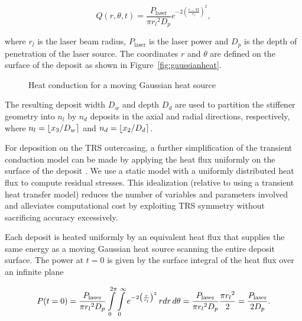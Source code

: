 \begin{equation}
	Q(r,\theta,t) = \dfrac{P_{\textrm{laser}}}{\pi{r_l}^2 D_p}e^{-2\left(\frac{r-{V}t}{r_l}\right)^2}, \label{eg:gaussian}
\end{equation}

where ${r_l}$ is the laser beam radius, $P_{\textrm{laser}}$ is the laser power and $D_p$ is the depth of penetration of the laser source. The coordinates $r$ and $\theta$ are defined on the surface of the deposit as shown in Figure~\ref{fig:gaussianheat}. 

\begin{figure}[h!]
	\centering
	 \hspace{0.1\textwidth}%
	\caption{Heat conduction for a moving Gaussian heat source}
	\label{fig:gaussian}
\end{figure}

The resulting deposit width $D_w$ and depth $D_d$ are used to partition the stiffener geometry into $n_l$ by $n_d$ deposits in the axial and radial directions, respectively, where $n_l = \lfloor x_3/D_w\rceil$ and $n_d = \lfloor x_2/D_d\rceil$. 

For deposition on the \ac{TRS} outercasing, a further simplification of the transient conduction model can be made by applying the heat flux uniformly on the surface of the deposit \cite{Nickel2001}. We use a static model with a uniformly distributed heat flux to compute residual stresses. This idealization (relative to using a transient heat transfer model) reduces the number of variables and parameters involved and alleviates computational cost by exploiting TRS symmetry without sacrificing accuracy excessively.

Each deposit is heated uniformly by an equivalent heat flux that supplies the same energy as a moving Gaussian heat source scanning the entire deposit surface. The power at $t=0$ is given by the surface integral of the heat flux over an infinite plane

\begin{equation}
	\label{eq:power}
	P(t=0) = \dfrac{P_{\textrm{laser}}}{\pi{r_l}^2 D_p} \int\limits_{0}^{2\pi} \int\limits_{0}^{\infty} e^{-2\left(\frac{r}{r_l}\right)^2} \,rdr\,d\theta = \dfrac{P_{\textrm{laser}}}{\pi{r_l}^2 D_p}\dfrac{\pi{r_l}^2}{2} = \dfrac{P_{\textrm{laser}}}{2D_p}.
\end{equation}


